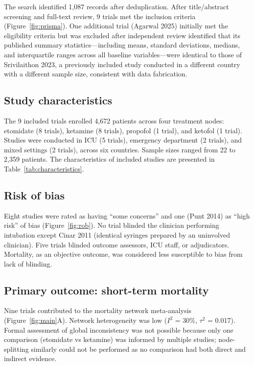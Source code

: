 \documentclass[11pt]{article}
\begin{document}
The search identified 1,087 records after deduplication. After title/abstract screening and full-text review, 9 trials met the inclusion criteria (Figure~\ref{fig:prisma}). One additional trial (Agarwal 2025\cite{agarwal2025}) initially met the eligibility criteria but was excluded after independent review identified that its published summary statistics---including means, standard deviations, medians, and interquartile ranges across all baseline variables---were identical to those of Srivilaithon 2023,\cite{srivilaithon2023} a previously included study conducted in a different country with a different sample size, consistent with data fabrication.

\subsection{Study characteristics}

The 9 included trials\cite{jabre2009,cinar2011,punt2014,smischney2019,matchett2022,knack2023,srivilaithon2023,casey2025,schmidt2025} enrolled 4,672 patients across four treatment nodes: etomidate (8 trials), ketamine (8 trials), propofol (1 trial), and ketofol (1 trial). Studies were conducted in ICU (5 trials), emergency department (2 trials), and mixed settings (2 trials), across six countries. Sample sizes ranged from 22 to 2,359 patients. The characteristics of included studies are presented in Table~\ref{tab:characteristics}.

\subsection{Risk of bias}

Eight studies were rated as having ``some concerns'' and one (Punt 2014\cite{punt2014}) as ``high risk'' of bias (Figure~\ref{fig:rob}). No trial blinded the clinician performing intubation except Cinar 2011\cite{cinar2011} (identical syringes prepared by an uninvolved clinician). Five trials blinded outcome assessors, ICU staff, or adjudicators.\cite{jabre2009,knack2023,srivilaithon2023,smischney2019,schmidt2025} Mortality, as an objective outcome, was considered less susceptible to bias from lack of blinding.

\subsection{Primary outcome: short-term mortality}

Nine trials contributed to the mortality network meta-analysis (Figure~\ref{fig:main}A). Network heterogeneity was low ($I^2$ = 30\%, $\tau^2$ = 0.017). Formal assessment of global inconsistency was not possible because only one comparison (etomidate vs ketamine) was informed by multiple studies; node-splitting similarly could not be performed as no comparison had both direct and indirect evidence.
\end{document}
